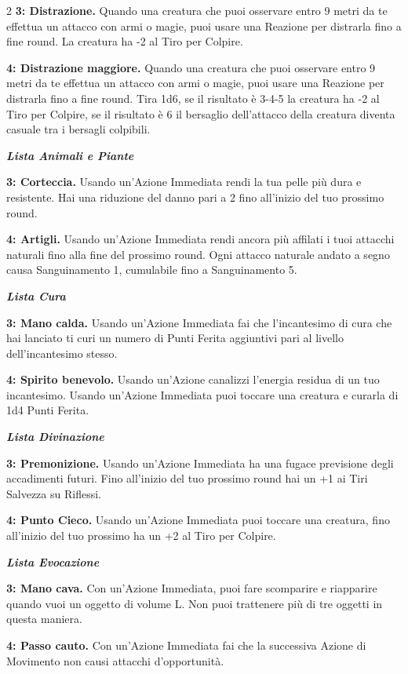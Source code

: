 \begin{multicols}{2}
\textbf{3: Distrazione.} Quando una creatura che puoi osservare entro 9 metri da te effettua un attacco con armi o magie, puoi usare una Reazione per distrarla fino a fine round. La creatura ha -2 al Tiro per Colpire.

\textbf{4: Distrazione maggiore.} Quando una creatura che puoi osservare entro 9 metri da te effettua un attacco con armi o magie, puoi usare una Reazione per distrarla fino a fine round. Tira 1d6, se il risultato è 3-4-5 la creatura ha -2 al Tiro per Colpire, se il risultato è 6 il bersaglio dell'attacco della creatura diventa casuale tra i bersagli colpibili.

\emph{\textbf{Lista Animali e Piante}}

\textbf{3: Corteccia.} Usando un'Azione Immediata rendi la tua pelle più dura e resistente. Hai una riduzione del danno pari a 2 fino all'inizio del tuo prossimo round.

\textbf{4: Artigli.} Usando un'Azione Immediata rendi ancora più affilati i tuoi attacchi naturali fino alla fine del prossimo round. Ogni attacco naturale andato a segno causa Sanguinamento 1, cumulabile fino a Sanguinamento 5.

\emph{\textbf{Lista Cura}}

\textbf{3: Mano calda.} Usando un'Azione Immediata fai che l'incantesimo di cura che hai lanciato ti curi un numero di Punti Ferita aggiuntivi pari al livello dell'incantesimo stesso.

\textbf{4: Spirito benevolo.} Usando un'Azione canalizzi l'energia residua di un tuo incantesimo. Usando un'Azione Immediata puoi toccare una creatura e curarla di 1d4 Punti Ferita.

\emph{\textbf{Lista Divinazione}}

\textbf{3: Premonizione.} Usando un'Azione Immediata ha una fugace previsione degli accadimenti futuri. Fino all'inizio del tuo prossimo round hai un +1 ai Tiri Salvezza su Riflessi.

\textbf{4: Punto Cieco.} Usando un'Azione Immediata puoi toccare una creatura, fino all'inizio del tuo prossimo ha un +2 al Tiro per Colpire.

\emph{\textbf{Lista Evocazione}}

\textbf{3: Mano cava.} Con un'Azione Immediata, puoi fare scomparire e riapparire quando vuoi un oggetto di volume L. Non puoi trattenere più di tre oggetti in questa maniera.

\textbf{4: Passo cauto.} Con un'Azione Immediata fai che la successiva Azione di Movimento non causi attacchi d'opportunità.


\end{multicols}
